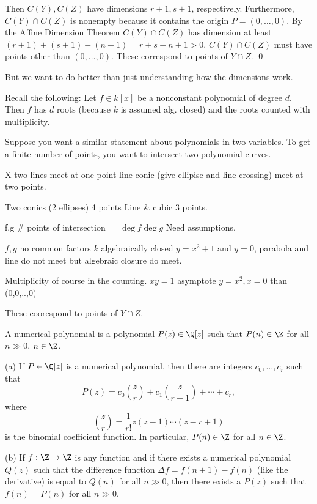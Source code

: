 Then $C(Y), C(Z)$ have dimensions $r+1, s+1$, respectively. Furthermore, $C(Y) \cap C(Z)$ is nonempty because it contains the origin $P= (0,\ldots,0)$. By the Affine Dimension Theorem $C(Y) \cap C(Z)$ has dimension at least $(r+1)+(s+1)-(n+1)= r+s-n+1 > 0$. $C(Y) \cap C(Z)$ must have points other than $(0,\ldots,0)$. These correspond to points of $Y \cap Z$. \qed


But we want to do better than just understanding how the dimensions work.


Recall the following: Let $f \in k[x]$ be a nonconstant polynomial of degree $d$. Then $f$ has $d$ roots (because $k$ is assumed alg. closed) and the roots counted with multiplicity. 

Suppose you want a similar statement about polynomials in two variables. To get a finite number of points, you want to intersect two polynomial curves. 

X two lines meet at one point
line conic (give ellipise and line crossing) meet at two points.

Two conics (2 ellipses) 4 points
Line \& cubic 3 points.

f,g \# points of intersection $= \deg f \deg g$ Need assumptions.

$f,g$ no common factors
$k$ algebraically closed
$y= x^2+1$ and $y=0$, parabola and line do not meet but algebraic closure do meet.

Multiplicity of course in the counting. 
$xy=1$ asymptote
$y=x^2, x=0$ than (0,0,..,0)

These coorespond to points of $Y \cap Z$.


\begin{dfn}
A numerical polynomial is a polynomial $P(z) \in \Q[z]$ such that $P(n) \in \Z$ for all $n \gg 0$, $n \in \Z$.
\end{dfn}


\begin{prop}
(a) If $P \in \Q[z]$ is a numerical polynomial, then there are integers $c_0,\ldots,c_r$ such that 
	\[
	P(z)= c_0 \binom{z}{r} + c_1 \binom{z}{r-1} + \cdots + c_r,
	\]
where
	\[
	\binom{z}{r}= \dfrac{1}{r!} z(z-1)\cdots(z-r+1)
	\]
is the binomial coefficient function. In particular, $P(n) \in \Z$ for all $n \in \Z$.

(b) If $f: \Z \to \Z$ is any function and if there exists a numerical polynomial $Q(z)$ such that the difference function $\Delta f= f(n+1) - f(n)$ (like the derivative) is equal to $Q(n)$ for all $n \gg 0$, then there exists a $P(z)$ such that $f(n)= P(n)$ for all $n \gg 0$. 
\end{prop}

